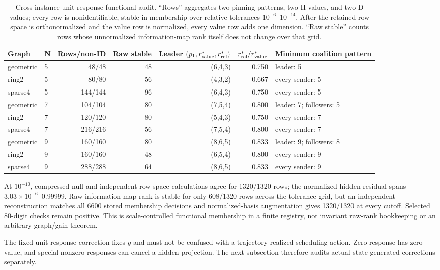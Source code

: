 \documentclass[10pt,twocolumn,twoside]{IEEEtran}
\begin{document}
\begin{table}[t]
\caption{Cross-instance unit-response functional audit. ``Rows'' aggregates two pinning
patterns, two H values, and two D values; every row is nonidentifiable, stable
in membership over relative tolerances \(10^{-6}\)--\(10^{-14}\).  After the
retained row space is orthonormalized and the value row is normalized, every
value row adds one dimension. ``Raw stable'' counts rows whose unnormalized
information-map rank itself does not change over that grid.}
\label{tab:links}
\centering
\scriptsize
\begin{tabular}{llrrrrl}
\toprule
Graph & N & Rows/non-ID & Raw stable & Leader $(p_1,r_{\rm value}^*,r_{\rm rel}^*)$ & $r_{\rm rel}^*/r_{\rm value}^*$ & Minimum coalition pattern \\
\midrule
geometric & 5 & 48/48 & 48 & (6,4,3) & 0.750 & leader: 5 \\
ring2 & 5 & 80/80 & 56 & (4,3,2) & 0.667 & every sender: 5 \\
sparse4 & 5 & 144/144 & 96 & (6,4,3) & 0.750 & every sender: 5 \\
geometric & 7 & 104/104 & 80 & (7,5,4) & 0.800 & leader: 7; followers: 5 \\
ring2 & 7 & 120/120 & 80 & (5,4,3) & 0.750 & every sender: 7 \\
sparse4 & 7 & 216/216 & 56 & (7,5,4) & 0.800 & every sender: 7 \\
geometric & 9 & 160/160 & 80 & (8,6,5) & 0.833 & leader: 9; followers: 8 \\
ring2 & 9 & 160/160 & 48 & (6,5,4) & 0.800 & every sender: 9 \\
sparse4 & 9 & 288/288 & 64 & (8,6,5) & 0.833 & every sender: 9 \\
\bottomrule
\end{tabular}
\end{table}

At \(10^{-10}\), compressed-null and independent row-space calculations agree
for 1320/1320 rows; the normalized hidden residual spans
\(3.03\times10^{-6}\)--0.99999.  Raw information-map rank is stable for only
608/1320 rows across the tolerance grid, but an independent reconstruction
matches all 6600 stored membership decisions and normalized-basis augmentation
gives 1320/1320 at every cutoff.  Selected 80-digit checks remain positive.
This is scale-controlled functional membership in a finite registry, not
invariant raw-rank bookkeeping or an arbitrary-graph/gain theorem.

The fixed unit-response correction fixes \(g\) and must not be confused with a
trajectory-realized scheduling action.  Zero response has zero value, and
special nonzero responses can cancel a hidden projection.  The next subsection
therefore audits actual state-generated corrections separately.
\end{document}
